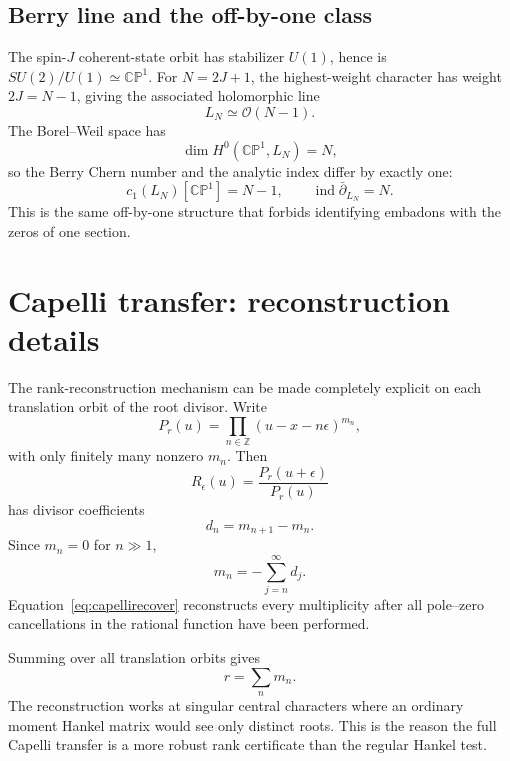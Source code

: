 \documentclass[aps,prd,preprint,nofootinbib,superscriptaddress]{revtex4-2}
\theoremstyle{definition}
\theoremstyle{remark}
\newcommand{\cO}{\mathcal O}
\newcommand{\ind}{\operatorname{ind}}
\newcommand{\CP}{\mathbb{CP}}
\begin{document}
\subsection{Berry line and the off-by-one class}

The spin-$J$ coherent-state orbit has stabilizer $U(1)$, hence is
$SU(2)/U(1)\simeq\CP^1$.  For $N=2J+1$, the highest-weight character has
weight $2J=N-1$, giving the associated holomorphic line
\begin{equation}
L_N\simeq\cO(N-1).
\end{equation}
The Borel--Weil space has
\begin{equation}
\dim H^0(\CP^1,L_N)=N,
\end{equation}
so the Berry Chern number and the analytic index differ by exactly one:
\begin{equation}
c_1(L_N)[\CP^1]=N-1,
\qquad
\ind\bar\partial_{L_N}=N.
\end{equation}
This is the same off-by-one structure that forbids identifying embadons with
the zeros of one section.

\section{Capelli transfer: reconstruction details}
\label{app:capelli}

The rank-reconstruction mechanism can be made completely explicit on each
translation orbit of the root divisor.  Write
\begin{equation}
P_r(u)=\prod_{n\in\mathbb Z}(u-x-n\epsilon)^{m_n},
\end{equation}
with only finitely many nonzero $m_n$.  Then
\begin{equation}
R_\epsilon(u)
=
\frac{P_r(u+\epsilon)}{P_r(u)}
\end{equation}
has divisor coefficients
\begin{equation}
d_n=m_{n+1}-m_n.
\end{equation}
Since $m_n=0$ for $n\gg1$,
\begin{equation}
m_n=-\sum_{j=n}^{\infty}d_j.
\label{eq:capellirecover}
\end{equation}
Equation~\eqref{eq:capellirecover} reconstructs every multiplicity after all
pole--zero cancellations in the rational function have been performed.

Summing over all translation orbits gives
\begin{equation}
r=\sum_nm_n.
\end{equation}
The reconstruction works at singular central characters where an ordinary
moment Hankel matrix would see only distinct roots.  This is the reason the
full Capelli transfer is a more robust rank certificate than the regular
Hankel test.
\end{document}
